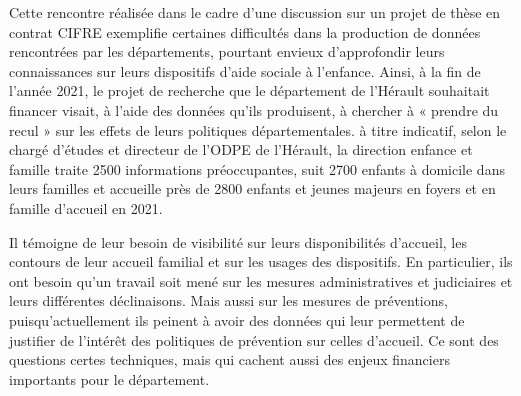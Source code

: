 \documentclass[
  12,
  a4paper,
]{report}
\begin{document}
\begin{mdframed}[frametitle= Exemple d'une rencontre avec un chargé de mission de la direction enfance et famille et de l'ODPE du département de l'Hérault]

Cette rencontre réalisée dans le cadre d'une discussion sur un projet de thèse en contrat CIFRE exemplifie certaines difficultés dans la production de données rencontrées par les départements, pourtant envieux d'approfondir leurs connaissances sur leurs dispositifs d'aide sociale à l'enfance. Ainsi, à la fin de l'année 2021, le projet de recherche que le département de l'Hérault souhaitait financer visait, à l'aide des données qu'ils produisent, à chercher à « prendre du recul » sur les effets de leurs politiques départementales. à titre indicatif, selon le chargé d'études et directeur de l'ODPE de l'Hérault, la direction enfance et famille traite 2500 informations préoccupantes, suit 2700 enfants à domicile dans leurs familles et accueille près de 2800 enfants et jeunes majeurs en foyers et en famille d'accueil en 2021.

Il témoigne de leur besoin de visibilité sur leurs disponibilités d'accueil, les contours de leur accueil familial et sur les usages des dispositifs. En particulier, ils ont besoin qu'un travail soit mené sur les mesures administratives et judiciaires et leurs différentes déclinaisons. Mais aussi sur les mesures de préventions, puisqu'actuellement ils peinent à avoir des données qui leur permettent de justifier de l'intérêt des politiques de prévention sur celles d'accueil. Ce sont des questions certes techniques, mais qui cachent aussi des enjeux financiers importants pour le département.


\end{mdframed}
\end{document}
